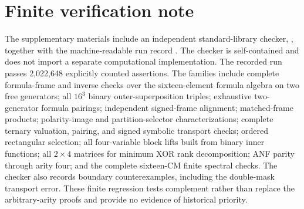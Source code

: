 \documentclass[11pt]{article}
\theoremstyle{definition}
\theoremstyle{remark}
\begin{document}
\section{Finite verification note}
The supplementary materials include an independent standard-library checker, , together with the machine-readable run record .  The checker is self-contained and does not import a separate computational implementation.  The recorded run passes 2,022,648 explicitly counted assertions.  The families include complete formula-frame and inverse checks over the sixteen-element formula algebra on two free generators; all $16^3$ binary outer-superposition triples; exhaustive two-generator formula pairings; independent signed-frame alignment; matched-frame products; polarity-image and partition-selector characterizations; complete ternary valuation, pairing, and signed symbolic transport checks; ordered rectangular selection; all four-variable block lifts built from binary inner functions; all $2\times4$ matrices for minimum XOR rank decomposition; ANF parity through arity four; and the complete sixteen-CM finite spectral checks.  The checker also records boundary counterexamples, including the double-mask transport error.  These finite regression tests complement rather than replace the arbitrary-arity proofs and provide no evidence of historical priority.
\end{document}
